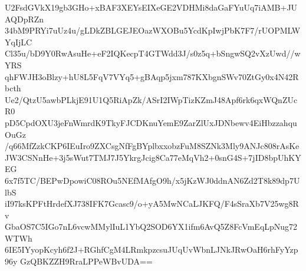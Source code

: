 U2FsdGVkX19gb3GHo+xBAF3XEYsEIXeGE2VDHMi8daGaFYuUq7iAMB+JUAQDpRZn
34bM9PRYi7uUz4u/gLDkZBLGEJEOazWXOBu5YcdKpIwjPbK7F7/rUOPMLWYqIjLC
Cl35u/bD9Y0RwAsuHe+eF2IQKecpT4GTWdd3J/s0z5q+bSngwSQ2vXzUwd//wYRS
qhFWJH3oBlzy+hU8L5FqV7VYq5+gBAqp5jxm787KXbgnSWv70ZtGy0x4N42Rbcth
Ue2/QtzU5awbPLkjE91U1Q5RiApZk/ASrI2IWpTizKZmJ48Apf6rk6qxWQnZUcR0
pD5CpdOXU3jeFnWmrdK9TkyFJCDKnuYemE9ZarZlUxJDNbewv4EiHbzzahquOuGz
/q66MfZzkCKP6IEuIro9ZXCsgNfFgBYplbxxobzFuM8SZNk3Mly9ANJc808rAsKe
JW3CSNnHe+3j5sWut7TMJ7J5YkrgJcig8Ca77eMqVh2+0snG4S+7jID8bpUhKYEG
6x7f5TC/BEPwDpowiC08ROu5NEfMAfgO9h/x5jKzWJ0ddnAN6Zd2T8k89dp7UlbS
iI97ksKPFtHrdefXJ738IFK7Gcasc9/o+yA5MwNCaLJKFQ/F4sSraXb7V25wg8Rv
GbaOS7C5IGo7nL6vcwMMylIuL1YbQ2SOD6YX1ifm6AvQ5Z8FcVmEqLpNug72WTWh
6IE5IYyopKcyh6f2J+RGhfCgM4LRmkpzcsuJUqUvWbnLJNkJRwOaH6rhFyYzp96y
GzQBKZZH9RraLPPeWBvUDA==
